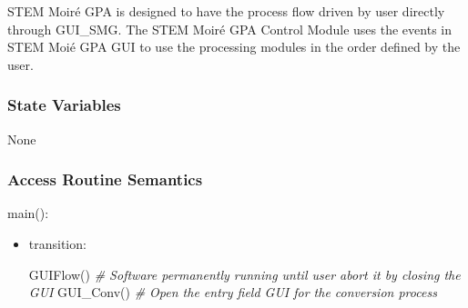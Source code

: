 \documentclass[12pt, titlepage]{article}
\newcommand{\progname}{STEM Moir{\'e} GPA}
\begin{document}
\progname{} is designed to have the process flow driven by user directly through 
GUI{\_}SMG. The STEM Moir{\'e} GPA Control Module uses the events in STEM 
Moi{\'e} GPA GUI to use the processing modules in the order defined by the user.

\subsubsection{State Variables}

None

\subsubsection{Access Routine Semantics}

\noindent main():
\begin{itemize}
\item transition:

GUIFlow()
\noindent\textit{{\#} Software permanently running until user abort it by 
closing the GUI} \medskip
GUI{\_}Conv()
\noindent\textit{{\#} Open the entry field GUI for the conversion process} 
\medskip


\end{itemize}
\end{document}
